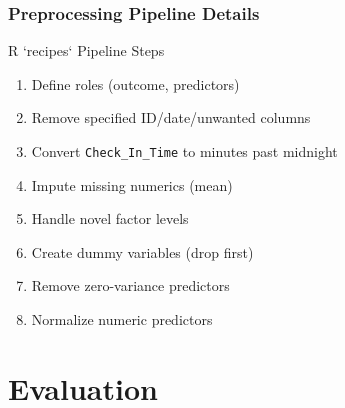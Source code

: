 \documentclass{beamer}
\begin{document}
\begin{frame}
\frametitle{Preprocessing Pipeline Details}
        \begin{block}{R `recipes` Pipeline Steps}
        \begin{enumerate}
            \item Define roles (outcome, predictors)
            \item Remove specified ID/date/unwanted columns
            \item Convert \texttt{Check\_In\_Time} to minutes past midnight
            \item Impute missing numerics (mean)
            \item Handle novel factor levels
            \item Create dummy variables (drop first)
            \item Remove zero-variance predictors
            \item Normalize numeric predictors
        \end{enumerate}
        \end{block}
        

\end{frame}

\section{Evaluation}
\end{document}
